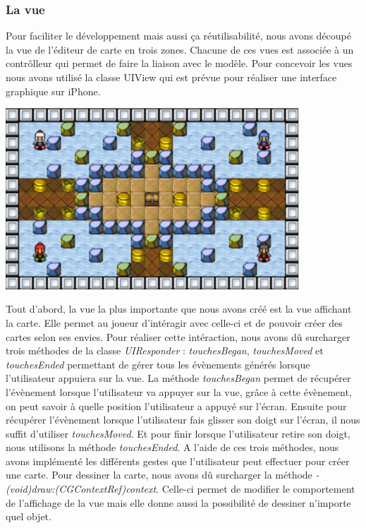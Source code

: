 	\subsubsection{La vue}
		Pour faciliter le développement mais aussi ça réutilisabilité, nous avons découpé la vue de l'éditeur de carte en trois zones. Chacune de ces vues est associée à un contrôlleur qui permet de faire la liaison avec le modèle. Pour concevoir les vues nous avons utilisé la classe UIView qui est prévue pour réaliser une interface graphique sur iPhone. 
			
		\begin{center}
			\includegraphics[width=11cm]{./Developpement/Img/carte.eps}
		\end{center}
		Tout d'abord, la vue la plus importante que nous avons créé est la vue affichant la carte. Elle permet au joueur d'intéragir avec celle-ci et de pouvoir créer des cartes selon ses envies. Pour réaliser cette intéraction, nous avons dû surcharger trois méthodes de la classe \textit{UIResponder} : \textit{touchesBegan}, \textit{touchesMoved} et \textit{touchesEnded} permettant de gérer tous les évènements générés lorsque l'utilisateur appuiera sur la vue. La méthode \textit{touchesBegan} permet de récupérer l'évènement lorsque l'utilisateur va appuyer sur la vue, grâce à cette évènement, on peut savoir à quelle position l'utilisateur a appuyé sur l'écran. Ensuite pour récupérer l'évènement lorsque l'utilisateur fais glisser son doigt sur l'écran, il nous suffit d'utiliser \textit{touchesMoved}. Et pour finir lorsque l'utilisateur retire son doigt, nous utilisons la méthode \textit{touchesEnded}. A l'aide de ces trois méthodes, nous avons implémenté les différents gestes que l'utilisateur peut effectuer pour créer une carte. Pour dessiner la carte, nous avons dû surcharger la méthode \textit{- (void)draw:(CGContextRef)context}. Celle-ci permet de modifier le comportement de l'affichage de la vue mais elle donne aussi la possibilité de dessiner n'importe quel objet.
		

